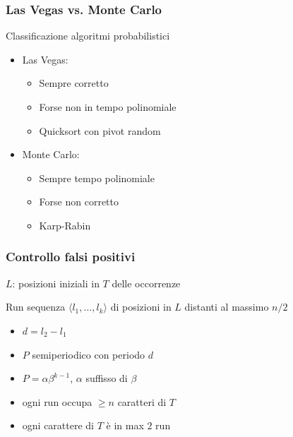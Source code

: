 \begin{frame}[fragile]
\frametitle{Las Vegas vs.
  Monte Carlo}
\begin{block}{Classificazione algoritmi probabilistici}
\begin{itemize}
\item
Las Vegas:
\begin{itemize}
\item
Sempre corretto
\item
Forse non in tempo polinomiale
\item
Quicksort con pivot random
\end{itemize}
\item
Monte Carlo:
\begin{itemize}
\item
Sempre tempo polinomiale
\item
Forse non corretto
\item
Karp-Rabin
\end{itemize}
\end{itemize}
\end{block}
\end{frame}


\begin{frame}[fragile]
\frametitle{Controllo falsi positivi}
$L$: posizioni iniziali in $T$ delle occorrenze
\begin{block}{Run}
sequenza $\langle l_{1}, \ldots, l_{k}\rangle$ di posizioni in $L$ distanti al
massimo $n/2$
\end{block}

\begin{itemize}
\item
$d=l_{2}-l_{1}$
\item
$P$ semiperiodico con periodo $d$
\item
$P=\alpha\beta^{k-1}$, $\alpha$ suffisso di $\beta$
\item
ogni run occupa $\ge n$ caratteri di $T$
\item
ogni carattere  di $T$ è in max $2$ run
\end{itemize}
\end{frame}


